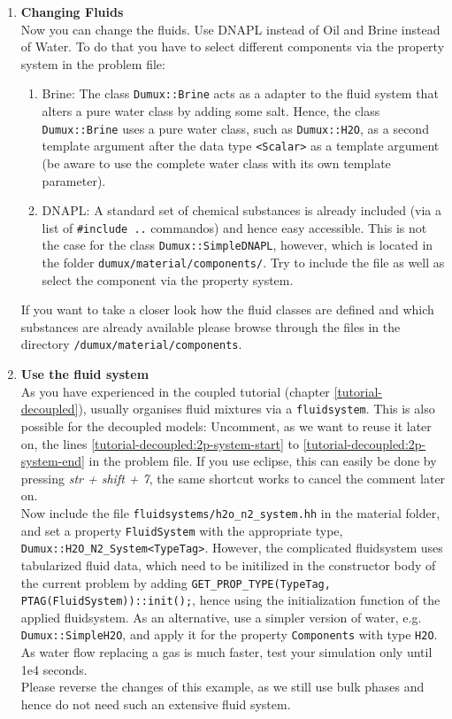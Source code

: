 \begin{enumerate}
\item \textbf{Changing Fluids} \\
Now you can change the fluids. Use DNAPL instead of Oil and Brine instead of Water. To do that you have to select different components via the property system in the problem file:
\begin{enumerate}
 \item Brine: The class \texttt{Dumux::Brine} acts as a adapter to the fluid system that alters a pure water class by adding some salt. Hence, the class \texttt{Dumux::Brine} uses a pure water class, such as \texttt{Dumux::H2O}, as a second template argument after the data type \texttt{<Scalar>} as a template argument (be aware to use the complete water class with its own template parameter).
 \item DNAPL: A standard set of chemical substances is already included (via a list of \texttt{\#include ..} commandos) and hence easy accessible. This is not the case for the class \texttt{Dumux::SimpleDNAPL}, however, which is located in the folder \texttt{dumux/material/components/}. Try to include the file as well as select the component via the property system.
\end{enumerate}
If you want to take a closer look how the fluid classes are defined and which substances are already available please browse through the files in the directory
\texttt{/dumux/material/components}.

\item \textbf{Use the \Dumux fluid system}\label{dec-ex1-fluidsystem} \\
As you have experienced in the coupled tutorial (chapter \ref{tutorial-decoupled}), \Dumux usually organises fluid mixtures via a \texttt{fluidsystem}. This is also possible for the decoupled models: Uncomment, as we want to reuse it later on, the lines \ref{tutorial-decoupled:2p-system-start} to \ref{tutorial-decoupled:2p-system-end} in the problem file. If you use eclipse, this can easily be done by pressing \textit{str + shift + 7}, the same shortcut works to cancel the comment later on.\\
Now include the file \texttt{fluidsystems/h2o\_n2\_system.hh} in the material folder, and set a property \texttt{FluidSystem} with the appropriate type, \texttt{Dumux::H2O\_N2\_System<TypeTag>}. However, the complicated fluidsystem uses tabularized fluid data, which need to be initilized in the constructor body of the current problem by adding \texttt{GET\_PROP\_TYPE(TypeTag, PTAG(FluidSystem))::init();}, hence using the initialization function of the applied fluidsystem. As an alternative, use a simpler version of water, e.g. \texttt{Dumux::SimpleH2O}, and apply it for the property \texttt{Components} with type \texttt{H2O}. As water flow replacing a gas is much faster, test your simulation only until 1e4 seconds.\\
Please reverse the changes of this example, as we still use bulk phases and hence do not need such an extensive fluid system.
 

\end{enumerate}
